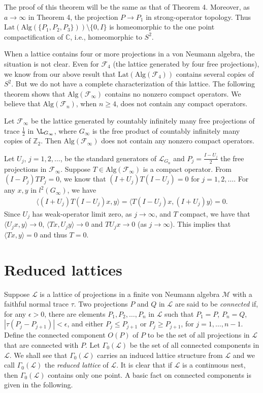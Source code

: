 \documentclass{pnastwo}
\newenvironment{proof}[1][Proof]{\begin{trivlist}
\item[\hskip \labelsep {\bfseries #1}]}{\end{trivlist}}
\newcommand{\F}{\mathcal F}
\newcommand{\LLL}{\mathcal L} %
\newcommand{\M}{\mathcal M}
\newcommand{\Lat}{\mathrm{Lat}}
\newcommand{\Alg}{\mathrm{Alg}}
\newcommand{\C}{\mathbb C} %
\newcommand{\Z}{\mathbb Z} %
\begin{document}
\begin{article}
The proof of this theorem will be the same as that of Theorem 4.
Moreover, as $a\to\infty$ in Theorem 4, the projection $P\to P_1$
in strong-operator topology. Thus $\Lat(\Alg(\{P_1, P_2, P_3\}))
\setminus\{0,I\}$ is homeomorphic to the one point compactification
of $\C$, i.e., homeomorphic to $S^2$.

When a lattice contains four or more projections in a von Neumann
algebra, the situation is not clear.  Even for $\F_4$ (the lattice
generated by four free projections), we know from our above result
that $\Lat(\Alg(\F_4))$ contains several copies of $S^2$. But we
do not have a complete characterization of this lattice. The
following theorem shows that $\Alg(\F_\infty)$ contains no nonzero
compact operators. We believe that $\Alg(\F_n)$, when $n\ge4$,
does not contain any compact operators.

\begin{theorem}
Let $\F_\infty$ be the
lattice generated by countably infinitely many free projections of
trace $\frac12$ in $\L_{G_\infty}$, where $G_\infty$ is the free
product of countably infinitely many copies of $\Z_2$. Then
$\Alg(\F_\infty)$ does not contain any nonzero compact operators.
\end{theorem}

\begin{proof}
Let $U_j$, $j=1,2,\ldots$,  be the
standard generators of $\LLL_{G_n}$ and $P_j=\frac{I-U_j}2$ the free
projections in $\F_\infty$. Suppose $T\in\Alg(\F_\infty)$ is a
compact operator. From $(I-P_j)TP_j=0$, we know that
$(I+U_j)T(I-U_j)=0$ for $j=1,2,\ldots$. For any $x,y$ in
$l^2(G_\infty)$, we have
\begin{align*}
 \langle (I+U_j)T(I-U_j)x,y  \rangle= \langle T(I-U_j)x, (I+U_j)y  \rangle=0.
\end{align*}
Since $U_j$ has weak-operator limit zero, as $j\to\infty$, and $T$
compact, we have that $ \langle U_jx,y  \rangle \to 0$, $ \langle Tx, U_jy  \rangle \to0$ and
$TU_jx\to0$ (as $j\to\infty$). This implies that $ \langle Tx,y  \rangle=0$ and
thus $T=0$.
\end{proof}

\section{Reduced lattices}

Suppose $\LLL$ is a lattice of projections in a finite von
Neumann algebra $\M$ with a faithful normal trace $\tau$. Two
projections $P$ and $Q$ in $\LLL$ are said to be {\it connected} if,
for any $\epsilon>0$, there are elements $P_1, P_2,\ldots, P_n$ in
$\LLL$ such that $P_1=P$, $P_n=Q$, $|\tau(P_j-P_{j+1})|<\epsilon$,
and either $P_j\le P_{j+1}$ or $P_j\ge P_{j+1}$, for $j=1,\ldots,
n-1$. Define the connected component $O(P)$ of $P$ to be the set
of all projections in $\LLL$ that are connected with $P$. Let
$\Gamma_0(\LLL)$ be the set of all connected components in $\LLL$. We
shall see that $\Gamma_0(\LLL)$ carries an induced lattice structure
from $\LLL$ and we call $\Gamma_0(\LLL)$ the {\it reduced lattice} of
$\LLL$. It is clear that if $\LLL$ is a continuous nest, then
$\Gamma_0(\LLL)$ contains only one point. A basic fact on connected
components is given in the following.


\end{article}
\end{document}

